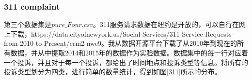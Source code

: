 \documentclass[a4paper, UTF8]{article}
\begin{document}
\begin{CJK}{UTF8}{gbsn}
\subsubsection*{311 complaint}
第三个数据集是$pure\_Four.csv$。311服务请求数据在纽约是开放的，可以自行在网上下载，https://data.cityofnewyork.us/Social-Services/311-Service-Requests-from-2010-to-Present/erm2-nwe9。我从数据开源平台下载了从2010年到现在的所有数据，并从中提取2014和2015年的数据作为实验数据。数据集中的每一行对应着一个投诉，并且对于每一个投诉，都给出了时间地点和投诉类型等信息。将所有的投诉类型划分为四类，进行简单的数量统计，得到如图\ref{311}所示的分布。
\begin{figure}[ht]
\centering
{}
\end{figure}
\end{CJK}
\end{document}
